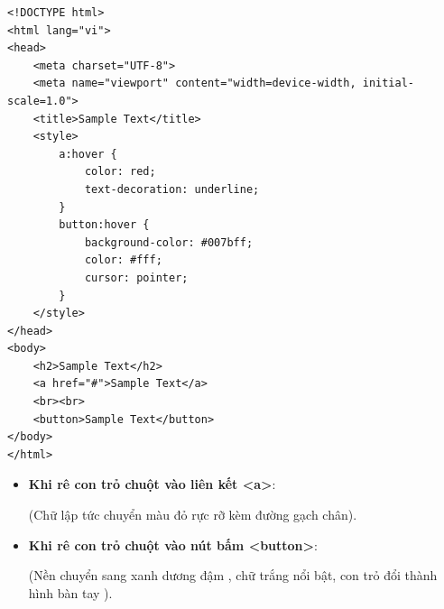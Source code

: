 \begin{codeWindow}
\begin{lstlisting}[language=HTML5]
<!DOCTYPE html>
<html lang="vi">
<head>
    <meta charset="UTF-8">
    <meta name="viewport" content="width=device-width, initial-scale=1.0">
    <title>Sample Text</title>
    <style>
        a:hover {
            color: red;
            text-decoration: underline;
        }
        button:hover {
            background-color: #007bff;
            color: #fff;
            cursor: pointer;
        }
    </style>
</head>
<body>
    <h2>Sample Text</h2>
    <a href="#">Sample Text</a>
    <br><br>
    <button>Sample Text</button>
</body>
</html>
\end{lstlisting}
\end{codeWindow}

\begin{browserWindow}
\sffamily\small
\begin{itemize}[leftmargin=1.5em, itemsep=3pt, parsep=0pt]
    \item \textbf{Khi rê con trỏ chuột vào liên kết <a>}:
    \par\vspace{2pt}
    \quad (Chữ lập tức chuyển màu đỏ rực rỡ kèm đường gạch chân).
    \par\vspace{4pt}
    \item \textbf{Khi rê con trỏ chuột vào nút bấm <button>}:
    \par\vspace{2pt}
    \quad (Nền chuyển sang xanh dương đậm , chữ trắng nổi bật, con trỏ đổi thành hình bàn tay ).
\end{itemize}
\end{browserWindow}

